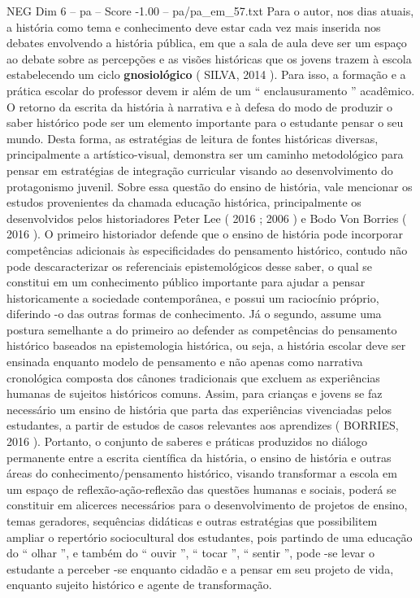 \begin{textsample}{NEG Dim 6 – pa – Score -1.00 – pa/pa\_em\_57.txt}
Para o autor, nos dias atuais, a história como tema e conhecimento deve estar cada vez mais inserida nos debates envolvendo a história pública, em que a sala de aula deve ser um espaço ao debate sobre as percepções e as visões históricas que os jovens trazem à escola estabelecendo um ciclo \textbf{gnosiológico} ( SILVA, 2014 ).
Para isso, a formação e a prática escolar do professor devem ir além de um “ enclausuramento ” acadêmico.
O retorno da escrita da história à narrativa e à defesa do modo de produzir o saber histórico pode ser um elemento importante para o estudante pensar o seu mundo.
Desta forma, as estratégias de leitura de fontes históricas diversas, principalmente a artístico-visual, demonstra ser um caminho metodológico para pensar em estratégias de integração curricular visando ao desenvolvimento do protagonismo juvenil.
Sobre essa questão do ensino de história, vale mencionar os estudos provenientes da chamada educação histórica, principalmente os desenvolvidos pelos historiadores Peter Lee ( 2016 ; 2006 ) e Bodo Von Borries ( 2016 ).
O primeiro historiador defende que o ensino de história pode incorporar competências adicionais às especificidades do pensamento histórico, contudo não pode descaracterizar os referenciais epistemológicos desse saber, o qual se constitui em um conhecimento público importante para ajudar a pensar historicamente a sociedade contemporânea, e possui um raciocínio próprio, diferindo -o das outras formas de conhecimento.
Já o segundo, assume uma postura semelhante a do primeiro ao defender as competências do pensamento histórico baseados na epistemologia histórica, ou seja, a história escolar deve ser ensinada enquanto modelo de pensamento e não apenas como narrativa cronológica composta dos cânones tradicionais que excluem as experiências humanas de sujeitos históricos comuns.
Assim, para crianças e jovens se faz necessário um ensino de história que parta das experiências vivenciadas pelos estudantes, a partir de estudos de casos relevantes aos aprendizes ( BORRIES, 2016 ).
Portanto, o conjunto de saberes e práticas produzidos no diálogo permanente entre a escrita científica da história, o ensino de história e outras áreas do conhecimento/pensamento histórico, visando transformar a escola em um espaço de reflexão-ação-reflexão das questões humanas e sociais, poderá se constituir em alicerces necessários para o desenvolvimento de projetos de ensino, temas geradores, sequências didáticas e outras estratégias que possibilitem ampliar o repertório sociocultural dos estudantes, pois partindo de uma educação do “ olhar ”, e também do “ ouvir ”, “ tocar ”, “ sentir ”, pode -se levar o estudante a perceber -se enquanto cidadão e a pensar em seu projeto de vida, enquanto sujeito histórico e agente de transformação.

\end{textsample}
